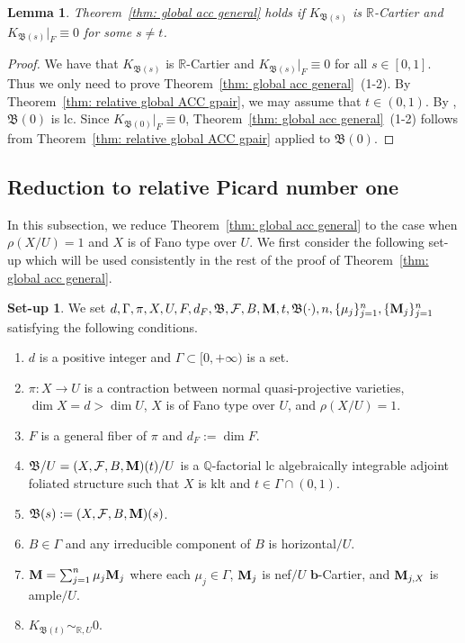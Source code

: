 \documentclass[11pt,reqno]{amsart}
\numberwithin{equation}{section}
\newcommand{\bb}{\bm{b}}
\newcommand{\Mm}{{\bf{M}}}
\newcommand{\Bb}{{\mathfrak{B}}}
\newcommand{\Ff}{\mathcal{F}}
\newcommand{\Ii}{\Gamma}
\newtheorem{lem}[thm]{Lemma}
\theoremstyle{definition}
\newtheorem{setup}[thm]{Set-up}
\begin{document}
\begin{lem}\label{lem: no part 2 case}
Theorem~\ref{thm: global acc general} holds if $K_{\Bb(s)}$ is $\mathbb R$-Cartier and $K_{\Bb(s)}|_F\equiv 0$ for some $s\neq t$.
\end{lem}
\begin{proof}
We have that $K_{\Bb(s)}$ is $\mathbb R$-Cartier and $K_{\Bb(s)}|_F\equiv 0$ for all $s\in [0,1]$. Thus we only need to prove Theorem~\ref{thm: global acc general}~(1-2). By Theorem~\ref{thm: relative global ACC gpair}, we may assume that $t\in (0,1)$. By \cite[Proposition~3.3]{Cas+24}, $\Bb(0)$ is lc. Since $K_{\Bb(0)}|_F\equiv 0$, Theorem~\ref{thm: global acc general}~(1-2) follows from Theorem~\ref{thm: relative global ACC gpair} applied to $\Bb(0)$.
\end{proof}

\subsection{Reduction to relative Picard number one}

In this subsection, we reduce Theorem~\ref{thm: global acc general} to the case when $\rho(X/U)=1$ and $X$ is of Fano type over $U$. We first consider the following set-up which will be used consistently in the rest of the proof of Theorem~\ref{thm: global acc general}.

\begin{setup}\label{setup: global acc}
We set
$d,\Ii,\pi,X,U,F,d_F,\Bb,\Ff,B,\Mm,t,\Bb(\cdot),n,\{\mu_j\}_{j=1}^n,\{\Mm_j\}_{j=1}^n$ satisfying the following conditions.
    \begin{enumerate}
    \item $d$ is a positive integer and $\Ii\subset [0,+\infty)$ is a set.
    \item $\pi: X\rightarrow U$ is a contraction between normal quasi-projective varieties, $\dim X=d>\dim U$, $X$ is of Fano type over $U$, and $\rho(X/U)=1$.
    \item $F$ is a general fiber of $\pi$ and $d_F:=\dim F$.
    \item $\Bb/U=(X,\Ff,B,\Mm)(t)/U$ is a $\mathbb Q$-factorial lc algebraically integrable adjoint foliated structure such that $X$ is klt and $t\in\Ii\cap (0,1)$.
    \item $\Bb(s):=(X,\Ff,B,\Mm)(s)$.
    \item $B\in\Ii$ and any irreducible component of $B$ is horizontal$/U$.
    \item $\Mm=\sum_{j=1}^n\mu_j\Mm_j$ where each $\mu_j\in\Ii$, $\Mm_j$ is nef$/U$ $\bb$-Cartier, and $\Mm_{j,X}$ is ample$/U$.
    \item $K_{\Bb(t)}\sim_{\mathbb R,U}0$.
    \end{enumerate}
\end{setup}
\end{document}

